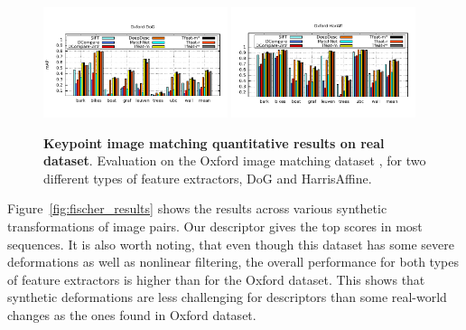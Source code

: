 \begin{figure}
\centering
\includegraphics[trim={0.5cm 1.2cm 0.5cm 1.8cm},width=0.48\textwidth]{main/chapter02/images/oxford_dog}
\includegraphics[trim={0.5cm 1.2cm 0.5cm 1.8cm},width=0.48\textwidth]{main/chapter02/images/oxford_haraff}
\caption[Keypoint image matching quantitative results on real dataset]{\textbf{Keypoint image matching quantitative results on real dataset}. Evaluation on the Oxford image matching dataset
  \cite{schmid2003performance}, for two different types of feature
  extractors, DoG and  HarrisAffine.}
\label{fig:oxford_results}
\vspace{-0.2cm}
\end{figure}

Figure~\ref{fig:fischer_results} shows the results across various synthetic transformations of image pairs. Our descriptor gives the  top scores in most sequences. It is also worth noting, that even though this dataset has some severe deformations as well as nonlinear filtering, the overall performance for both types of feature extractors is higher than for the Oxford dataset. This shows that synthetic deformations are less challenging for descriptors than some real-world changes as the ones found in Oxford dataset.

